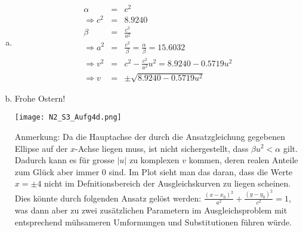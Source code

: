 \documentclass[11pt]{article} %
\begin{document}
\begin{enumerate}[a)]
\item
\begin{eqnarray*}
\alpha &=& c^2 \\ \Rightarrow c^2 &=& 8.9240 \\
\beta &=& \frac{c^2}{a^2} \\
\Rightarrow a^2 &=& \frac {c^2} \beta = \frac \alpha \beta = 15.6032 \\
\Rightarrow v^2 &=& c^2-\frac{c^2}{a^2}u^2  = 8.9240 - 0.5719u^2 \\
\Rightarrow v &=&\pm\sqrt{8.9240 - 0.5719u^2}
\end{eqnarray*}

\item Frohe Ostern!

\texttt{[image: N2\_S3\_Aufg4d.png]}

Anmerkung: Da die Hauptachse der durch die Ansatzgleichung gegebenen Ellipse auf der $x$-Achse liegen muss, ist nicht sichergestellt, dass $\beta u^2 < \alpha$ gilt. Dadurch kann es für grosse $|u|$ zu komplexen $v$ kommen, deren realen Anteile zum Glück aber immer 0 sind. Im Plot sieht man das daran, dass die Werte $x = \pm 4$ nicht im Defnitionsbereich der Ausgleichskurven zu liegen scheinen. Dies könnte durch folgenden Ansatz gelöst werden: $\frac{(x - x_0)^2}{a^2} + \frac{(y -y_0)^2}{c^2} = 1$, was dann aber zu zwei zusätzlichen Parametern im Ausgleichsproblem mit entsprechend mühsameren Umformungen und Substitutionen führen würde.

\end{enumerate}
\end{document}
